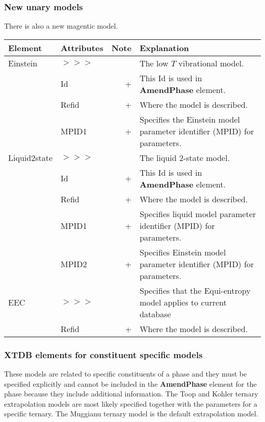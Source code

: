 \documentclass{article}
\begin{document}
\subsubsection{New unary models}

There is also a new magentic model.

\bigskip
\begin{tabular}{|p{} p{} r p{}|}\hline
  Element & Attributes & Note & Explanation\\\hline

  Einstein &$>>>$&& The low $T$ vibrational model.\\
      & Id & + & This Id is used in {\bf AmendPhase} element.\\
      & Refid & + & Where the model is described.\\
      & MPID1 & + & Specifies the Einstein model parameter identifier (MPID) for parameters.\\\hline

  Liquid2state &$>>>$&& The liquid 2-state model.\\
      & Id & + & This Id is used in {\bf AmendPhase} element.\\
      & Refid & + & Where the model is described.\\
      & MPID1 & + & Specifies liquid model parameter identifier (MPID) for parameters.\\
      & MPID2 & + & Specifies Einstein model parameter identifier (MPID) for parameters.\\\hline

  EEC &$>>>$&& Specifies that the Equi-entropy model applies to current database\\
      & Refid & + & Where the model is described.\\\hline

\end{tabular}

\subsubsection{XTDB elements for constituent specific models}\label{sec:toop}

These models are related to specific constituents of a phase and they
must be specified explicitly and cannot be included in the {\bf
  AmendPhase} element for the phase because they include additional
information.  The Toop and Kohler ternary extrapolation models are
most likely specified together with the parameters for a specific
ternary.  The Muggianu ternary model is the default extrapolation
model.
\end{document}
